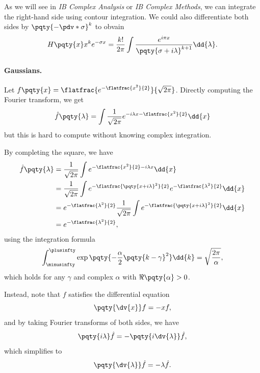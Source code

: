 As we will see in \textit{IB Complex Analysis} or \textit{IB Complex Methods}, we can integrate the right-hand side using contour integration. We could also differentiate both sides by \(\pqty{-\pdv*{\sigma}}^k\) to obvain
\begin{equation}
    H\pqty{x} x^k e^{- \sigma x} = \frac{k!}{2 \pi} \int \frac{e^{i \pi x}}{\pqty{\sigma + i \lambda}^{k + 1}} \dd{\lambda}.
\end{equation}

\paragraph{Gaussians.} Let \(f\pqty{x} = \flatfrac{e^{- \flatfrac{x^2}{2}}}{\sqrt{2 \pi}}\). Directly computing the Fourier transform, we get
\begin{equation}
    \hat{f}\pqty{\lambda} = \int \frac{1}{\sqrt{2 \pi}} e^{- i \lambda x - \flatfrac{x^2}{2}} \dd{x}
\end{equation}
but this is hard to compute without knowing complex integration.

\small

By completing the square, we have
\begin{subequations}
    \begin{align}
        \hat{f}\pqty{\lambda} &= \frac{1}{\sqrt{2 \pi}} \int e^{- \flatfrac{x^2}{2} - i \lambda x} \dd{x} \\
        &= \frac{1}{\sqrt{2 \pi}} \int e^{- \flatfrac{\pqty{x + i \lambda}^2}{2}} e^{- \flatfrac{\lambda^2}{2}} \dd{x} \\
        &= e^{- \flatfrac{\lambda^2}{2}} \frac{1}{\sqrt{2 \pi}} \int e^{- \flatfrac{\pqty{x + i \lambda}^2}{2}} \dd{x} \\
        &= e^{- \flatfrac{\lambda^2}{2}},
    \end{align}
\end{subequations}
using the integration formula
\begin{equation}
    \int_{\minusinfty}^{\plusinfty} \exp\pqty{- \frac{\alpha}{2} \pqty{k - \gamma}^2} \dd{k} = \sqrt{\frac{2 \pi}{\alpha}},
\end{equation}
which holds for any \(\gamma\) and complex \(\alpha\) with \(\Re\pqty{\alpha} > 0\).

\normalsize

Instead, note that \(f\) satisfies the differential equation
\begin{equation}
    \pqty{\dv{x}} f = - x f,
\end{equation}
and by taking Fourier transforms of both sides, we have
\begin{equation}
    \pqty{i \lambda} \hat{f} = - \pqty{i \dv{\lambda}} \hat{f},
\end{equation}
which simplifies to
\begin{equation}
    \pqty{\dv{\lambda}} \hat{f} = - \lambda \hat{f}.
\end{equation}

